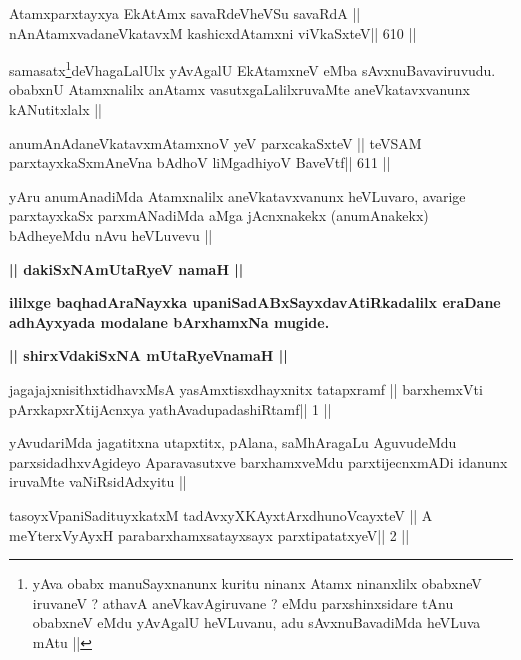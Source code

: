 \begin{shl}
Atamxparxtayxya EkAtAmx savaRdeVheVSu savaRdA ||
nAnAtamxvadaneVkatavxM kashicxdAtamxni viVkaSxteV\hfill || 610 ||
\end{shl}

\begin{artha}
samasatx\footnote[1]{yAva obabx manuSayxnanunx kuritu ninanx Atamx
  ninanxlilx obabxneV iruvaneV ? athavA aneVkavAgiruvane ? eMdu
  parxshinxsidare tAnu obabxneV eMdu yAvAgalU heVLuvanu, adu
  sAvxnuBavadiMda heVLuva mAtu ||}deVhagaLalUlx yAvAgalU EkAtamxneV eMba
sAvxnuBavaviruvudu. obabxnU Atamxnalilx anAtamx vasutxgaLalilxruvaMte
aneVkatavxvanunx kANutitxlalx ||
\end{artha}

\begin{shl}
anumAnAdaneVkatavxmAtamxnoV yeV parxcakaSxteV ||
teVSAM parxtayxkaSxmAneVna bAdhoV liMgadhiyoV BaveVtf\hfill || 611 ||
\end{shl}

\begin{artha}
yAru anumAnadiMda Atamxnalilx aneVkatavxvanunx heVLuvaro, avarige
parxtayxkaSx parxmANadiMda aMga jAcnxnakekx (anumAnakekx) bAdheyeMdu
nAvu heVLuvevu ||
\end{artha}


\begin{center}
{\Large{\textbf{|| dakiSxNAmUtaRyeV namaH ||}}}

{\textbf{ililxge baqhadAraNayxka upaniSadABxSayxdavAtiRkadalilx eraDane
adhAyxyada modalane bArxhamxNa mugide.}}
\end{center}

\begin{center}
{\large{\textbf{|| shirxVdakiSxNA mUtaRyeVnamaH ||}}}
\end{center}

\begin{shl}
jagajajxnisithxtidhavxMsA yasAmxtisxdhayxnitx tatapxramf ||
barxhemxVti pArxkapxrXtijAcnxya yathAvadupadashiRtamf\hfill || 1 ||
\end{shl}

\begin{artha}
yAvudariMda jagatitxna utapxtitx, pAlana, saMhAragaLu AguvudeMdu
parxsidadhxvAgideyo Aparavasutxve barxhamxveMdu parxtijecnxmADi
idanunx iruvaMte vaNiRsidAdxyitu || 
\end{artha}

\begin{shl}
tasoyxVpaniSadituyxkatxM tadAvxyXKAyx\s tArxdhunoVcayxteV ||
A meYterxVyAyxH parabarxhamxsatayxsayx parxtipatatxyeV\hfill || 2 ||
\end{shl}

